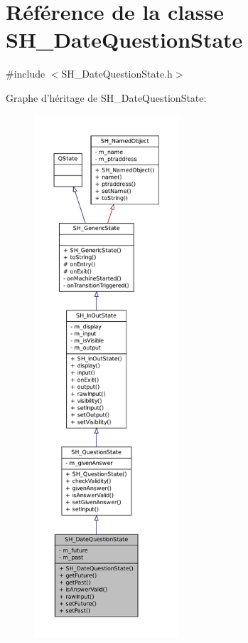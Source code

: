 \hypertarget{classSH__DateQuestionState}{\section{Référence de la classe S\-H\-\_\-\-Date\-Question\-State}
\label{classSH__DateQuestionState}
}


{\ttfamily \#include $<$S\-H\-\_\-\-Date\-Question\-State.\-h$>$}



Graphe d'héritage de S\-H\-\_\-\-Date\-Question\-State\-:\nopagebreak
\begin{figure}[H]
\begin{center}
\leavevmode
\includegraphics[height=550pt]{classSH__DateQuestionState__inherit__graph}
\end{center}
\end{figure}


